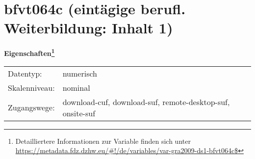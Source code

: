 
    \setcounter{footnote}{0}

    \vspace*{-1.8cm}
	\section{bfvt064c (eintägige berufl. Weiterbildung: Inhalt 1)}
	\label{section:bfvt064c}



    \vspace*{0.5cm}
    \noindent\textbf{Eigenschaften\footnote{Detailliertere Informationen zur Variable finden sich unter
		\url{https://metadata.fdz.dzhw.eu/\#!/de/variables/var-gra2009-ds1-bfvt064c$}}}\\
	\begin{tabularx}{\hsize}{@{}lX}
	Datentyp: & numerisch \\
	Skalenniveau: & nominal \\
	Zugangswege: &
	  download-cuf, 
	  download-suf, 
	  remote-desktop-suf, 
	  onsite-suf
 \\
    \end{tabularx}



